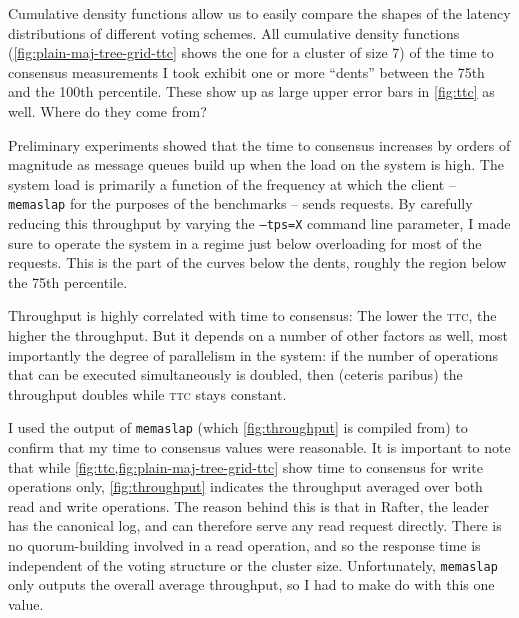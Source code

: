 \documentclass[12pt,chapterprefix=true,toc=bibliography,numbers=noendperiod,
               footnotes=multiple,twoside]{scrreprt}
\begin{document}
Cumulative density functions allow us to easily compare the shapes of the latency distributions of different voting schemes. All cumulative density functions (\cref{fig:plain-maj-tree-grid-ttc} shows the one for a cluster of size 7) of the time to consensus measurements I took exhibit one or more \enquote{dents} between the 75th and the 100th percentile. These show up as large upper error bars in \cref{fig:ttc} as well. Where do they come from?

Preliminary experiments showed that the time to consensus increases by orders of magnitude as message queues build up when the load on the system is high. The system load is primarily a function of the frequency at which the client -- \texttt{memaslap} for the purposes of the benchmarks -- sends requests. By carefully reducing this throughput by varying the \texttt{--tps=X} command line parameter, I made sure to operate the system in a regime just below overloading for most of the requests. This is the part of the curves below the dents, roughly the region below the 75th percentile.


Throughput is highly correlated with time to consensus: The lower the \textsc{ttc}, the higher the throughput. But it depends on a number of other factors as well, most importantly the degree of parallelism in the system: if the number of operations that can be executed simultaneously is doubled, then (ceteris paribus) the throughput doubles while \textsc{ttc} stays constant.

I used the output of \texttt{memaslap} (which \cref{fig:throughput} is compiled from) to confirm that my time to consensus values were reasonable. It is important to note that while \cref{fig:ttc,fig:plain-maj-tree-grid-ttc} show time to consensus for write operations only, \cref{fig:throughput} indicates the throughput averaged over both read and write operations. The reason behind this is that in Rafter, the leader has the canonical log, and can therefore serve any read request directly. There is no quorum-building involved in a read operation, and so the response time is independent of the voting structure or the cluster size. Unfortunately, \texttt{memaslap} only outputs the overall average throughput, so I had to make do with this one value.

\end{document}
